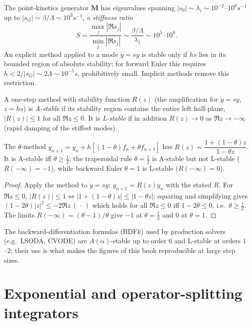 The point-kinetics generator $\mathbf M$ has eigenvalues spanning
$|s_0|\sim\lambda_i\sim10^{-2}$--$10^{0}\unit{s^{-1}}$ up to
$|s_G|\sim\beta/\Lambda\sim10^{3}\unit{s^{-1}}$, a \emph{stiffness ratio}
\begin{equation}
S=\frac{\max_j|\Re s_j|}{\min_j|\Re s_j|}\sim\frac{\beta/\Lambda}{\lambda_1}
\sim10^{5}\text{--}10^{6}.
\end{equation}
An explicit method applied to a mode $\dot y=s y$ is stable only if $hs$ lies in
its bounded region of absolute stability; for forward Euler this requires
$h<2/|s_G|\sim2\Lambda\sim10^{-5}\unit{s}$, prohibitively small. Implicit methods
remove this restriction.

\begin{definition}
A one-step method with stability function $R(z)$ (the amplification for
$\dot y=sy$, $z=hs$) is \emph{A-stable} if its stability region contains the entire
left half-plane, $|R(z)|\le1$ for all $\Re z\le0$. It is \emph{L-stable} if in
addition $R(z)\to0$ as $\Re z\to-\infty$ (rapid damping of the stiffest modes).
\end{definition}

\begin{theorem}
\label{thm:theta}
The $\theta$-method $y_{n+1}=y_n+h[(1-\theta)f_n+\theta f_{n+1}]$ has
$R(z)=\dfrac{1+(1-\theta)z}{1-\theta z}$. It is A-stable iff $\theta\ge\tfrac12$;
the trapezoidal rule $\theta=\tfrac12$ is A-stable but not L-stable
($R(-\infty)=-1$), while backward Euler $\theta=1$ is L-stable
($R(-\infty)=0$).
\end{theorem}
\begin{proof}
Apply the method to $\dot y=sy$: $y_{n+1}=R(z)y_n$ with the stated $R$. For
$\Re z\le0$, $|R(z)|\le1\iff|1+(1-\theta)z|\le|1-\theta z|$; squaring and
simplifying gives $(1-2\theta)|z|^2\le -2\Re z\,(\,\cdot\,)$ which holds for all
$\Re z\le0$ iff $1-2\theta\le0$, i.e.\ $\theta\ge\tfrac12$. The limits
$R(-\infty)=(\theta-1)/\theta$ give $-1$ at $\theta=\tfrac12$ and $0$ at
$\theta=1$.
\end{proof}

The backward-differentiation formulas (BDF$k$) used by production solvers (e.g.\
LSODA, CVODE) are $A(\alpha)$-stable up to order $6$ and L-stable at orders $1$--$2$;
their use is what makes the figures of this book reproducible at large step sizes.

\section{Exponential and operator-splitting integrators}
\label{sec:expint}

